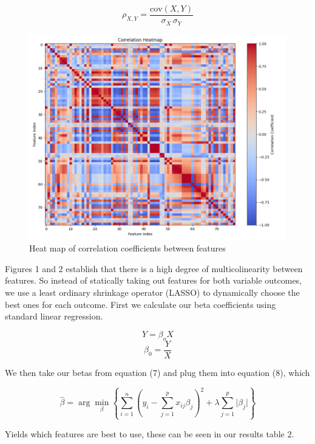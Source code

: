 \documentclass{article}
\begin{document}
\begin{equation}
\rho_{X,Y} = \frac{\text{cov}(X,Y)}{\sigma_X \, \sigma_Y}
\end{equation}

\begin{figure}[h]
    \centering
    \includegraphics[width=0.5\linewidth]{correlateheat.png}
    \caption{Heat map of correlation coefficients between features}
    \label{fig:placeholder}
\end{figure}

Figures 1 and 2 establish that there is a high degree of multicolinearity between features. So instead of statically taking out features for both variable outcomes, we use a least ordinary shrinkage operator (LASSO) to dynamically choose the best ones for each outcome. First we calculate our beta coefficients using standard linear regression.

\begin{equation} Y = \beta_o X \end{equation}
\begin{equation} \beta_0 = \frac{Y}{X}\end{equation}

\begin{indent}
We then take our betas from equation (7) and plug them into equation (8), which 
\end{indent}

\begin{equation} \hat{\beta} = \arg\min_{\beta} \left\{\sum_{i=1}^{n} \left( y_i - \sum_{j=1}^{p} x_{ij}\beta_j \right)^{2} + \lambda \sum_{j=1}^{p} \lvert \beta_j \rvert \right\} \end{equation}

\begin{noindent}
Yields which features are best to use, these can be seen in our results table 2. 
\end{noindent}
\end{document}
